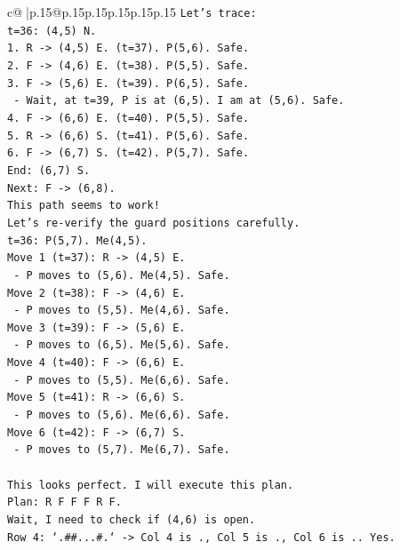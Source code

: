 \documentclass{article}
\begin{document}
{\begin{supertabular}{c@{$\;$}|p{.15\linewidth}@{}p{.15\linewidth}p{.15\linewidth}p{.15\linewidth}p{.15\linewidth}p{.15\linewidth}}
{{{\texttt{Let's trace:} \\
\texttt{t=36: (4,5) N.} \\
\texttt{1. R {-}> (4,5) E. (t=37). P(5,6). Safe.} \\
\texttt{2. F {-}> (4,6) E. (t=38). P(5,5). Safe.} \\
\texttt{3. F {-}> (5,6) E. (t=39). P(6,5). Safe.} \\
\texttt{   {-} Wait, at t=39, P is at (6,5). I am at (5,6). Safe.} \\
\texttt{4. F {-}> (6,6) E. (t=40). P(5,5). Safe.} \\
\texttt{5. R {-}> (6,6) S. (t=41). P(5,6). Safe.} \\
\texttt{6. F {-}> (6,7) S. (t=42). P(5,7). Safe.} \\
\texttt{End: (6,7) S.} \\
\texttt{Next: F {-}> (6,8).} \\
\texttt{This path seems to work!} \\
\texttt{Let's re{-}verify the guard positions carefully.} \\
\texttt{t=36: P(5,7). Me(4,5).} \\
\texttt{Move 1 (t=37): R {-}> (4,5) E.} \\
\texttt{  {-} P moves to (5,6). Me(4,5). Safe.} \\
\texttt{Move 2 (t=38): F {-}> (4,6) E.} \\
\texttt{  {-} P moves to (5,5). Me(4,6). Safe.} \\
\texttt{Move 3 (t=39): F {-}> (5,6) E.} \\
\texttt{  {-} P moves to (6,5). Me(5,6). Safe.} \\
\texttt{Move 4 (t=40): F {-}> (6,6) E.} \\
\texttt{  {-} P moves to (5,5). Me(6,6). Safe.} \\
\texttt{Move 5 (t=41): R {-}> (6,6) S.} \\
\texttt{  {-} P moves to (5,6). Me(6,6). Safe.} \\
\texttt{Move 6 (t=42): F {-}> (6,7) S.} \\
\texttt{  {-} P moves to (5,7). Me(6,7). Safe.} \\
\\ 
\texttt{This looks perfect. I will execute this plan.} \\
\texttt{Plan: R F F F R F.} \\
\texttt{Wait, I need to check if (4,6) is open.} \\
\texttt{Row 4: `.\#\#...\#.` {-}> Col 4 is ., Col 5 is ., Col 6 is .. Yes.} \\
}}}
\end{supertabular}}
\end{document}
